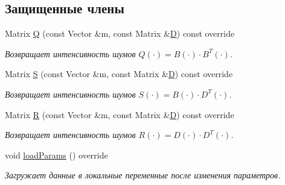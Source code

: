\subsection*{Защищенные члены}
\begin{DoxyCompactItemize}
\item 
Matrix \hyperlink{class_tasks_1_1_continuous_1_1_van_der_pol_linear_a69f80496b491d506987c50663918352d}{Q} (const Vector \&m, const Matrix \&\hyperlink{class_tasks_1_1_continuous_1_1_van_der_pol_linear_a07e8842a175006f214238a9f71e5ebdf}{D}) const override\hypertarget{class_tasks_1_1_continuous_1_1_van_der_pol_linear_a69f80496b491d506987c50663918352d}{}\label{class_tasks_1_1_continuous_1_1_van_der_pol_linear_a69f80496b491d506987c50663918352d}

\begin{DoxyCompactList}\small\item\em Возвращает интенсивность шумов $Q(\cdot) = B(\cdot) \cdot B^T(\cdot)$. \end{DoxyCompactList}\item 
Matrix \hyperlink{class_tasks_1_1_continuous_1_1_van_der_pol_linear_aa6cb67403faa3c2f894988aead527234}{S} (const Vector \&m, const Matrix \&\hyperlink{class_tasks_1_1_continuous_1_1_van_der_pol_linear_a07e8842a175006f214238a9f71e5ebdf}{D}) const override
\begin{DoxyCompactList}\small\item\em Возвращает интенсивность шумов $S(\cdot) = B(\cdot) \cdot D^T(\cdot)$. \end{DoxyCompactList}\item 
Matrix \hyperlink{class_tasks_1_1_continuous_1_1_van_der_pol_linear_a439da004e456566e378dd2b906dd232b}{R} (const Vector \&m, const Matrix \&\hyperlink{class_tasks_1_1_continuous_1_1_van_der_pol_linear_a07e8842a175006f214238a9f71e5ebdf}{D}) const override\hypertarget{class_tasks_1_1_continuous_1_1_van_der_pol_linear_a439da004e456566e378dd2b906dd232b}{}\label{class_tasks_1_1_continuous_1_1_van_der_pol_linear_a439da004e456566e378dd2b906dd232b}

\begin{DoxyCompactList}\small\item\em Возвращает интенсивность шумов $R(\cdot) = D(\cdot) \cdot D^T(\cdot)$. \end{DoxyCompactList}\item 
void \hyperlink{class_tasks_1_1_continuous_1_1_van_der_pol_linear_ab85ed77a22e47a2f122548de31d56d6a}{load\+Params} () override\hypertarget{class_tasks_1_1_continuous_1_1_van_der_pol_linear_ab85ed77a22e47a2f122548de31d56d6a}{}\label{class_tasks_1_1_continuous_1_1_van_der_pol_linear_ab85ed77a22e47a2f122548de31d56d6a}

\begin{DoxyCompactList}\small\item\em Загружает данные в локальные переменные после изменения параметров. \end{DoxyCompactList}\end{DoxyCompactItemize}

